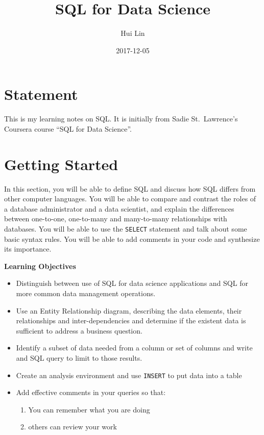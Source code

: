 \documentclass[]{book}
\title{SQL for Data Science}
\author{Hui Lin}
\date{2017-12-05}
\providecommand{\tightlist}{%
  \setlength{\itemsep}{0pt}\setlength{\parskip}{0pt}}
\theoremstyle{definition}
\theoremstyle{definition}
\theoremstyle{remark}
\begin{document}
\maketitle

\thispagestyle{empty}
\begin{center}
\end{center}

\setlength{\abovedisplayskip}{-5pt}
\setlength{\abovedisplayshortskip}{-5pt}

{
\setcounter{tocdepth}{2}
\tableofcontents
}
\chapter*{Statement}\label{statement}


This is my learning notes on SQL. It is initially from Sadie
St.~Lawrence's Coursera course ``SQL for Data Science''.

\chapter{Getting Started}\label{getting-started}

In this section, you will be able to define SQL and discuss how SQL
differs from other computer languages. You will be able to compare and
contrast the roles of a database administrator and a data scientist, and
explain the differences between one-to-one, one-to-many and many-to-many
relationships with databases. You will be able to use the
\texttt{SELECT} statement and talk about some basic syntax rules. You
will be able to add comments in your code and synthesize its importance.

\textbf{Learning Objectives}

\begin{itemize}
\tightlist
\item
  Distinguish between use of SQL for data science applications and SQL
  for more common data management operations.
\item
  Use an Entity Relationship diagram, describing the data elements,
  their relationships and inter-dependencies and determine if the
  existent data is sufficient to address a business question.
\item
  Identify a subset of data needed from a column or set of columns and
  write and SQL query to limit to those results.
\item
  Create an analysis environment and use \texttt{INSERT} to put data
  into a table
\item
  Add effective comments in your queries so that:

  \begin{enumerate}
  \def\labelenumi{\arabic{enumi}.}
  \tightlist
  \item
    You can remember what you are doing
  \item
    others can review your work
  \end{enumerate}
\end{itemize}
\end{document}
